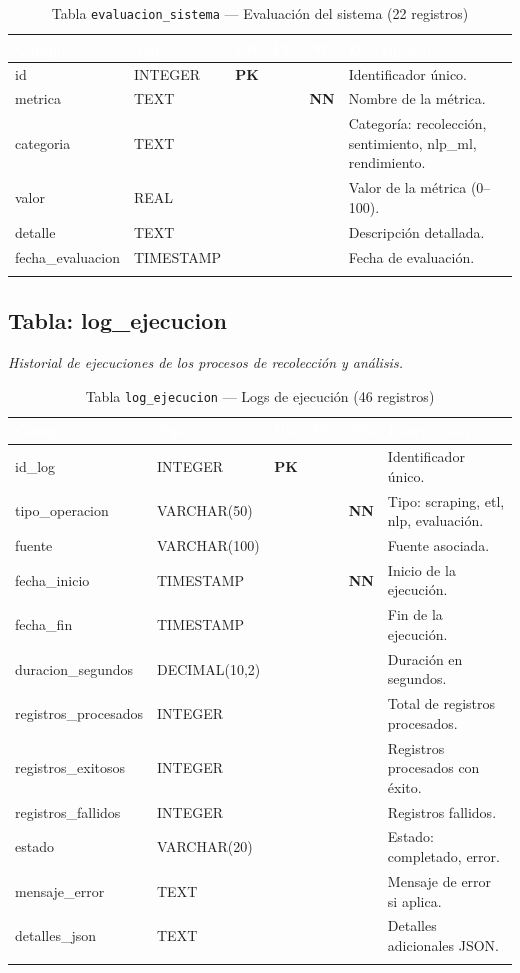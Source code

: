 \documentclass[11pt,a4paper]{article}
\newcommand{\tableheadrow}{\rowcolor{tableheader}}
\newcommand{\tablehead}[1]{\textcolor{white}{\textbf{#1}}}
\newcommand{\pk}{\textcolor{emiblue}{\textbf{PK}}}
\newcommand{\nn}{\textcolor{red!70!black}{\textbf{NN}}}
\begin{document}
\begin{longtable}{p{4.2cm} p{2.8cm} c c c p{4.5cm}}
\toprule
\tableheadrow
\tablehead{Campo} & \tablehead{Tipo} & \tablehead{PK} & \tablehead{FK} & \tablehead{NN} & \tablehead{Descripción} \\
\midrule
\endhead
id & INTEGER & \pk & & & Identificador único. \\
\rowcolor{tablerow}
metrica & TEXT & & & \nn & Nombre de la métrica. \\
categoria & TEXT & & & & Categoría: recolección, sentimiento, nlp\_ml, rendimiento. \\
\rowcolor{tablerow}
valor & REAL & & & & Valor de la métrica (0--100). \\
detalle & TEXT & & & & Descripción detallada. \\
\rowcolor{tablerow}
fecha\_evaluacion & TIMESTAMP & & & & Fecha de evaluación. \\
\bottomrule
\caption{Tabla \texttt{evaluacion\_sistema} — Evaluación del sistema (22 registros)}
\end{longtable}

\subsection{Tabla: log\_ejecucion}
\textit{Historial de ejecuciones de los procesos de recolección y análisis.}

\begin{longtable}{p{4.2cm} p{2.8cm} c c c p{4.5cm}}
\toprule
\tableheadrow
\tablehead{Campo} & \tablehead{Tipo} & \tablehead{PK} & \tablehead{FK} & \tablehead{NN} & \tablehead{Descripción} \\
\midrule
\endhead
id\_log & INTEGER & \pk & & & Identificador único. \\
\rowcolor{tablerow}
tipo\_operacion & VARCHAR(50) & & & \nn & Tipo: scraping, etl, nlp, evaluación. \\
fuente & VARCHAR(100) & & & & Fuente asociada. \\
\rowcolor{tablerow}
fecha\_inicio & TIMESTAMP & & & \nn & Inicio de la ejecución. \\
fecha\_fin & TIMESTAMP & & & & Fin de la ejecución. \\
\rowcolor{tablerow}
duracion\_segundos & DECIMAL(10,2) & & & & Duración en segundos. \\
registros\_procesados & INTEGER & & & & Total de registros procesados. \\
\rowcolor{tablerow}
registros\_exitosos & INTEGER & & & & Registros procesados con éxito. \\
registros\_fallidos & INTEGER & & & & Registros fallidos. \\
\rowcolor{tablerow}
estado & VARCHAR(20) & & & & Estado: completado, error. \\
mensaje\_error & TEXT & & & & Mensaje de error si aplica. \\
\rowcolor{tablerow}
detalles\_json & TEXT & & & & Detalles adicionales JSON. \\
\bottomrule
\caption{Tabla \texttt{log\_ejecucion} — Logs de ejecución (46 registros)}
\end{longtable}
\end{document}

